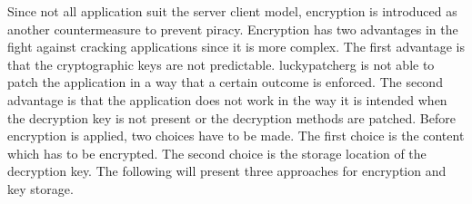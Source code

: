 Since not all application suit the server client model, encryption is introduced as another countermeasure to prevent piracy.
Encryption has two advantages in the fight against cracking applications since it is more complex.
The first advantage is that the cryptographic keys are not predictable.
\gls{luckypatcherg} is not able to patch the application in a way that a certain outcome is enforced.
The second advantage is that the application does not work in the way it is intended when the decryption key is not present or the decryption methods are patched.
\newline
\newline
Before encryption is applied, two choices have to be made.
The first choice is the content which has to be encrypted.
The second choice is the storage location of the decryption key.
\newline
The following will present three approaches for encryption and key storage.
